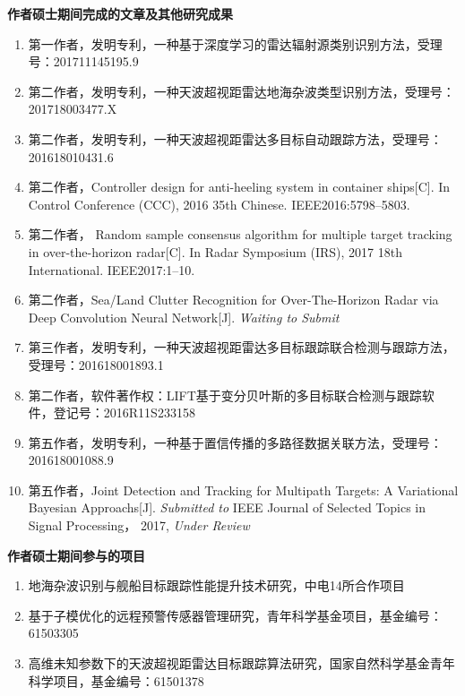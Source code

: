 \textbf{\Large{作者硕士期间完成的文章及其他研究成果}}
\begin{enumerate}
\item 第一作者，发明专利，一种基于深度学习的雷达辐射源类别识别方法，受理号：201711145195.9

\item 第二作者，发明专利，一种天波超视距雷达地海杂波类型识别方法，受理号：201718003477.X

\item 第二作者，发明专利，一种天波超视距雷达多目标自动跟踪方法，受理号：201618010431.6

\item 第二作者，Controller design for anti-heeling system in container ships[C]. In Control Conference (CCC), 2016 35th Chinese. IEEE2016:5798–5803.

\item 第二作者， Random sample consensus algorithm for multiple target tracking in over-the-horizon radar[C]. In Radar Symposium (IRS), 2017 18th International. IEEE2017:1–10.

\item 第二作者，Sea/Land Clutter Recognition for Over-The-Horizon Radar via Deep Convolution Neural Network[J]. \textit{Waiting to Submit}

\item 第三作者，发明专利，一种天波超视距雷达多目标跟踪联合检测与跟踪方法，受理号：201618001893.1

\item 第二作者，软件著作权：LIFT\underline{\hspace{0.5em}}基于变分贝叶斯的多目标联合检测与跟踪软件，登记号：2016R11S233158

\item 第五作者，发明专利，一种基于置信传播的多路径数据关联方法，受理号：201618001088.9

\item 第五作者，Joint Detection and Tracking for Multipath Targets: A Variational Bayesian Approachs[J]. \textit{Submitted to } IEEE Journal of Selected Topics in Signal Processing， 2017, \textit{Under Review}

\end{enumerate}

\textbf{\Large{作者硕士期间参与的项目}}

\begin{enumerate}

\item 地海杂波识别与舰船目标跟踪性能提升技术研究，中电14所合作项目

\item 基于子模优化的远程预警传感器管理研究，青年科学基金项目，基金编号：61503305

\item 高维未知参数下的天波超视距雷达目标跟踪算法研究，国家自然科学基金青年科学项目，基金编号：61501378

\end{enumerate}